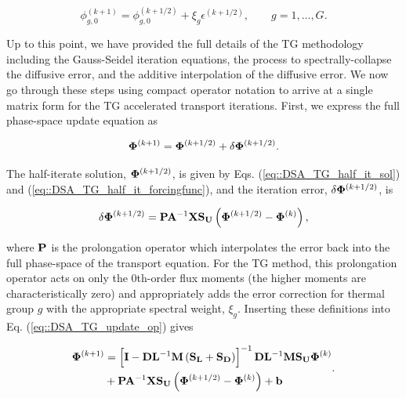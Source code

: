 \begin{equation}
\label{eq::DSA_TG_err_update}
 \phi_{g,0}^{(k+1)} =  \phi_{g,0}^{(k+1/2)}  + \xi_g \epsilon^{(k+1/2)}, \qquad g=1,...,G .
\end{equation}

Up to this point, we have provided the full details of the TG methodology including the Gauss-Seidel iteration equations, the process to spectrally-collapse the diffusive error, and the additive interpolation of the diffusive error. We now go through these steps using compact operator notation to arrive at a single matrix form for the TG accelerated transport iterations. First, we express the full phase-space update equation as 

\begin{equation}
\label{eq::DSA_TG_update_op}
 {\bf \Phi}^{(k+1)} =  {\bf \Phi}^{(k+1/2)}  + \delta {\bf \Phi}^{(k+1/2)} .
\end{equation}

\noindent The half-iterate solution, ${\bf \Phi}^{(k+1/2)}$, is given by Eqs. (\ref{eq::DSA_TG_half_it_sol}) and (\ref{eq::DSA_TG_half_it_forcingfunc}), and the iteration error, $\delta {\bf \Phi}^{(k+1/2)}$, is 

\begin{equation}
\label{eq::DSA_TG_proj_err}
\delta {\bf \Phi}^{(k+1/2)} =  {\bf P} {\bf A}^{-1}  {\bf X} {\bf S_{U}} \left(  {\bf \Phi}^{(k+1/2)} - {\bf \Phi}^{(k)}  \right),
\end{equation}

\noindent where ${\bf P}$ is the prolongation operator which interpolates the error back into the full phase-space of the transport equation. For the TG method, this prolongation operator acts on only the 0th-order flux moments (the higher moments are characteristically zero) and appropriately adds the error correction for thermal group $g$ with the appropriate spectral weight, $\xi_g$. Inserting these definitions into Eq. (\ref{eq::DSA_TG_update_op}) gives

\begin{equation}
\label{eq::DSA_TG_op_update_w_fullterms}
\begin{aligned}
 {\bf \Phi}^{(k+1)} &=  \left[ {\bf I} - {\bf D}{\bf L}^{-1} {\bf M} \left(  {\bf S_L} + {\bf S_D} \right) \right]^{-1} {\bf D}{\bf L}^{-1}  {\bf M} {\bf S_U} {\bf \Phi}^{(k)} \\
  &+  {\bf P} {\bf A}^{-1}  {\bf X} {\bf S_{U}} \left(  {\bf \Phi}^{(k+1/2)} - {\bf \Phi}^{(k)}  \right) + {\bf b}
\end{aligned} .
\end{equation}

